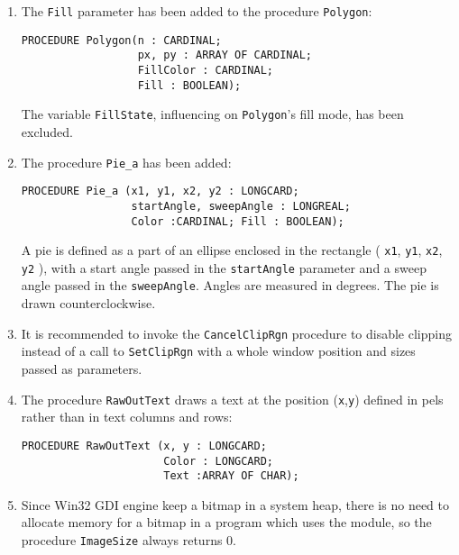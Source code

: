 \begin{enumerate}
      {\bf Note:} By "number of text columns" ("text rows") a maximum number
                  of monospaced font characters which can be placed into the {\bf Graph}
                  window in one column (row) is meant.

\item The \verb'Fill' parameter has been added to the procedure \verb'Polygon':

\begin{verbatim}
PROCEDURE Polygon(n : CARDINAL;
                  px, py : ARRAY OF CARDINAL;
                  FillColor : CARDINAL;
                  Fill : BOOLEAN);
\end{verbatim}

      The variable \verb'FillState', influencing on \verb'Polygon''s
      fill mode, has been excluded.

\item The procedure \verb'Pie_a' has been added:

\begin{verbatim}
PROCEDURE Pie_a (x1, y1, x2, y2 : LONGCARD;
                 startAngle, sweepAngle : LONGREAL;
                 Color :CARDINAL; Fill : BOOLEAN);
\end{verbatim}

        A pie is defined as a part of an ellipse enclosed in the rectangle
        ( \verb'x1', \verb'y1', \verb'x2', \verb'y2' ), with a start angle
        passed in the \verb'startAngle' parameter and a sweep angle passed
        in the \verb'sweepAngle'. Angles are measured in degrees. The pie
        is drawn counterclockwise.

\item It is recommended to invoke the \verb'CancelClipRgn' procedure to disable
      clipping instead of a call to \verb'SetClipRgn' with a whole window position
      and sizes passed as parameters.

\item The procedure \verb'RawOutText' draws a text at the position (\verb'x',\verb'y')
      defined in pels rather than in text columns and rows:

\begin{verbatim}
PROCEDURE RawOutText (x, y : LONGCARD;
                      Color : LONGCARD;
                      Text :ARRAY OF CHAR);
\end{verbatim}

\item Since Win32 GDI engine keep a bitmap in a system heap,
      there is no need to allocate memory for a bitmap in a program which
      uses the module, so the procedure \verb'ImageSize' always returns 0.


\end{enumerate}
